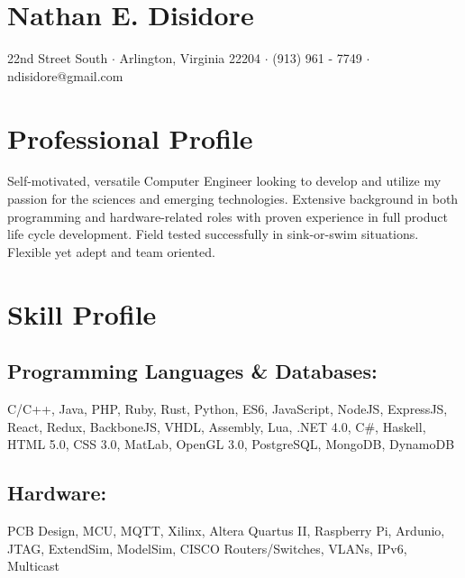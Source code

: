 \documentclass[10pt]{extarticle}
\newcommand{\startsquarepar}{\par\begingroup \parfillskip 0pt \relax}
\newcommand{\stopsquarepar}{\par\endgroup}
\begin{document}
\pagestyle{empty} %

\section*{\Huge Nathan E. Disidore}
\startsquarepar
  3429 22nd Street South $\cdot$ Arlington, Virginia 22204 $\cdot$ (913) 961 - 7749 $\cdot$ ndisidore@gmail.com
\stopsquarepar

\section*{Professional Profile}
Self-motivated, versatile Computer Engineer looking to develop and utilize my passion for the sciences and emerging technologies. Extensive background in both programming and hardware-related roles with proven experience in full product life cycle development. Field tested successfully in sink-or-swim situations. Flexible yet adept and team oriented.

\section*{Skill Profile}
\subsection*{Programming Languages \& Databases:}
C/C++, Java, PHP, Ruby, Rust, Python, ES6, JavaScript, NodeJS, ExpressJS, React, Redux, BackboneJS, VHDL, Assembly, Lua, .NET 4.0, C\#, Haskell, HTML 5.0, CSS 3.0, MatLab, OpenGL 3.0, PostgreSQL, MongoDB, DynamoDB
\subsection*{Hardware:}
PCB Design, MCU, MQTT, Xilinx, Altera Quartus II, Raspberry Pi, Ardunio, JTAG, ExtendSim, ModelSim, CISCO Routers/Switches, VLANs, IPv6, Multicast
\end{document}
